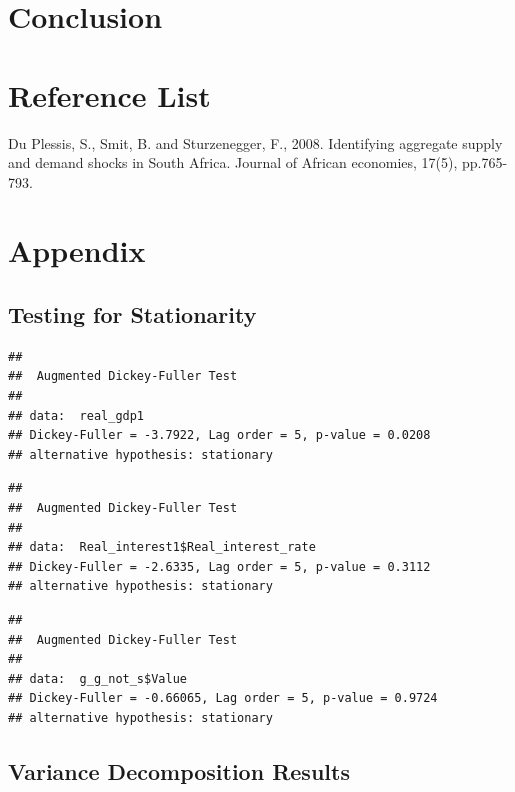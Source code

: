 \documentclass[11pt,preprint, authoryear]{elsarticle}
\numberwithin{equation}{section}
\numberwithin{figure}{section}
\numberwithin{table}{section}
\begin{document}
\hypertarget{conclusion}{%
\section{Conclusion}\label{conclusion}}

\newpage

\hypertarget{reference-list}{%
\section{Reference List}\label{reference-list}}

Du Plessis, S., Smit, B. and Sturzenegger, F., 2008. Identifying
aggregate supply and demand shocks in South Africa. Journal of African
economies, 17(5), pp.765-793.

\newpage

\hypertarget{appendix}{%
\section{Appendix}\label{appendix}}

\hypertarget{testing-for-stationarity}{%
\subsection{Testing for Stationarity}\label{testing-for-stationarity}}

\begin{verbatim}
## 
##  Augmented Dickey-Fuller Test
## 
## data:  real_gdp1
## Dickey-Fuller = -3.7922, Lag order = 5, p-value = 0.0208
## alternative hypothesis: stationary
\end{verbatim}

\begin{verbatim}
## 
##  Augmented Dickey-Fuller Test
## 
## data:  Real_interest1$Real_interest_rate
## Dickey-Fuller = -2.6335, Lag order = 5, p-value = 0.3112
## alternative hypothesis: stationary
\end{verbatim}

\begin{verbatim}
## 
##  Augmented Dickey-Fuller Test
## 
## data:  g_g_not_s$Value
## Dickey-Fuller = -0.66065, Lag order = 5, p-value = 0.9724
## alternative hypothesis: stationary
\end{verbatim}

\hypertarget{variance-decomposition-results}{%
\subsection{Variance Decomposition
Results}\label{variance-decomposition-results}}
\end{document}
